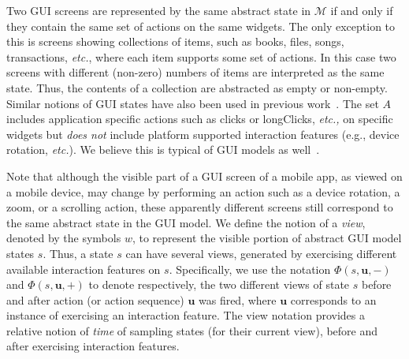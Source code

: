 
Two GUI screens are represented by the same abstract state in
$\mathcal{M}$ if and only if they contain the same set of actions on
the same widgets. The only exception to this is screens showing
collections of items, such as books, files, songs, transactions,
\textit{etc.}, where each item supports some set of actions. In this
case two screens with different (non-zero) numbers of items are
interpreted as the same state. Thus, the contents of a collection are
abstracted as empty or non-empty.  Similar notions of GUI states have
also been used in previous work~\cite{Dynodroid:2013,
  collider2013}. The set $A$ includes application specific actions
such as clicks or longClicks, \textit{etc.,} on specific widgets but
\textit{does not} include platform supported interaction features (e.g., device rotation, \textit{etc.}). We
believe this is typical of GUI models as well~\cite{YangFASE2013}.

Note that although the visible part of a GUI screen of a mobile app, as viewed on a mobile device, may change by performing an action such as a device rotation, a zoom, or a scrolling action, these apparently different screens still correspond to the same abstract state in the GUI model. We define the notion of a \textit{view}, denoted by the symbols $w$, to represent the visible portion of abstract GUI model states $s$. Thus, a state $s$ can have several views, generated by exercising different available interaction features on $s$. Specifically, we use the notation $\Phi(s, \mathbf{u}, -)$ and $\Phi(s, \mathbf{u}, +)$ to denote respectively, the two different views of state $s$ before and after action (or action sequence) $\mathbf{u}$ was fired, where $\mathbf{u}$ corresponds to an instance of exercising an interaction feature. The view notation provides a relative notion of \textit{time} of sampling states (for their current view), before and after exercising interaction features.

